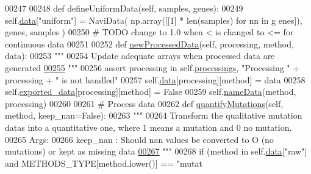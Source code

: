 \begin{DoxyCode}
00247 
00248     \textcolor{keyword}{def }defineUniformData(self, samples, genes):
00249         self.\hyperlink{classnavicom_1_1navicom_1_1NaviCom_aa1abff245573ed8406c6bddb4596f093}{data}[\textcolor{stringliteral}{"uniform"}] = NaviData( np.array([[1] * len(samples) \textcolor{keywordflow}{for} nn \textcolor{keywordflow}{in} g
      enes]), genes, samples )
00250         \textcolor{comment}{# TODO change to 1.0 when < is changed to <= for continuous data}
00251 
00252     \textcolor{keyword}{def }\hyperlink{classnavicom_1_1navicom_1_1NaviCom_a42c3198667c80bbf3d61a3d57b39a883}{newProcessedData}(self, processing, method, data):
00253         \textcolor{stringliteral}{"""}
00254 \textcolor{stringliteral}{        Update adequate arrays when processed data are generated}
\hypertarget{navicom_8py_source_l00255}{}\hyperlink{classnavicom_1_1navicom_1_1NaviCom_a42c3198667c80bbf3d61a3d57b39a883}{00255} \textcolor{stringliteral}{        """}
00256         \textcolor{keyword}{assert} processing \textcolor{keywordflow}{in} self.\hyperlink{classnavicom_1_1navicom_1_1NaviCom_a5a255d56e997ddcc653d8f06c741ea13}{processings}, \textcolor{stringliteral}{"Processing "} + processing + \textcolor{stringliteral}{" is 
      not handled"}
00257         self.\hyperlink{classnavicom_1_1navicom_1_1NaviCom_aa1abff245573ed8406c6bddb4596f093}{data}[processing][method] = data
00258         self.\hyperlink{classnavicom_1_1navicom_1_1NaviCom_a5995e07de24daa015b8b44b1ae0cada7}{exported_data}[processing][method] = \textcolor{keyword}{False}
00259         self.\hyperlink{classnavicom_1_1navicom_1_1NaviCom_a8e735eed992a5cf92616113d47eea6ee}{nameData}(method, processing)
00260 
00261     \textcolor{comment}{# Process data}
00262     \textcolor{keyword}{def }\hyperlink{classnavicom_1_1navicom_1_1NaviCom_a5314c49d6b9749693519a4a86cbfde71}{quantifyMutations}(self, method, keep\_nan=False):
00263         \textcolor{stringliteral}{"""}
00264 \textcolor{stringliteral}{        Transform the qualitative mutation datas into a quantitative one, where 1
       means a mutation and 0 no mutation.}
00265 \textcolor{stringliteral}{        Args:}
00266 \textcolor{stringliteral}{            keep\_nan : Should nan values be converted to O (no mutations) or kept
       as missing data}
\hypertarget{navicom_8py_source_l00267}{}\hyperlink{classnavicom_1_1navicom_1_1NaviCom_a5314c49d6b9749693519a4a86cbfde71}{00267} \textcolor{stringliteral}{        """}
00268         \textcolor{keywordflow}{if} (method \textcolor{keywordflow}{in} self.\hyperlink{classnavicom_1_1navicom_1_1NaviCom_aa1abff245573ed8406c6bddb4596f093}{data}[\textcolor{stringliteral}{"raw"}] \textcolor{keywordflow}{and} METHODS\_TYPE[method.lower()] == \textcolor{stringliteral}{"mutat
}
\end{DoxyCode}
